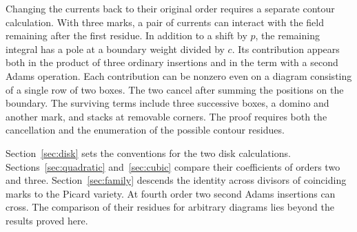 Changing the currents back to their original order requires a separate contour calculation. With three marks, a pair of currents can interact with the field remaining after the first residue. In addition to a shift by $p$, the remaining integral has a pole at a boundary weight divided by $c$. Its contribution appears both in the product of three ordinary insertions and in the term with a second Adams operation. Each contribution can be nonzero even on a diagram consisting of a single row of two boxes. The two cancel after summing the positions on the boundary. The surviving terms include three successive boxes, a domino and another mark, and stacks at removable corners. The proof requires both the cancellation and the enumeration of the possible contour residues.

Section~\ref{sec:disk} sets the conventions for the two disk calculations. Sections~\ref{sec:quadratic} and~\ref{sec:cubic} compare their coefficients of orders two and three. Section~\ref{sec:family} descends the identity across divisors of coinciding marks to the Picard variety. At fourth order two second Adams insertions can cross. The comparison of their residues for arbitrary diagrams lies beyond the results proved here.
